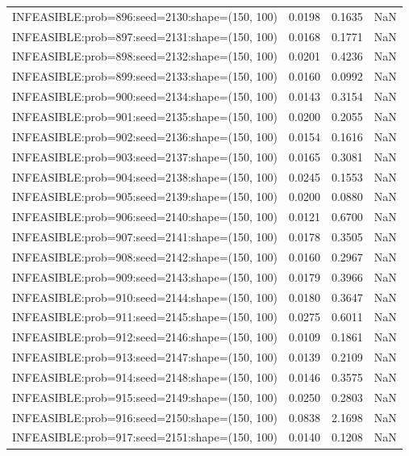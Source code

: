 \begin{longtable}{lccc}
INFEASIBLE:prob=896:seed=2130:shape=(150, 100) &   0.0198 &  0.1635 &    NaN \\
INFEASIBLE:prob=897:seed=2131:shape=(150, 100) &   0.0168 &  0.1771 &    NaN \\
INFEASIBLE:prob=898:seed=2132:shape=(150, 100) &   0.0201 &  0.4236 &    NaN \\
INFEASIBLE:prob=899:seed=2133:shape=(150, 100) &   0.0160 &  0.0992 &    NaN \\
INFEASIBLE:prob=900:seed=2134:shape=(150, 100) &   0.0143 &  0.3154 &    NaN \\
INFEASIBLE:prob=901:seed=2135:shape=(150, 100) &   0.0200 &  0.2055 &    NaN \\
INFEASIBLE:prob=902:seed=2136:shape=(150, 100) &   0.0154 &  0.1616 &    NaN \\
INFEASIBLE:prob=903:seed=2137:shape=(150, 100) &   0.0165 &  0.3081 &    NaN \\
INFEASIBLE:prob=904:seed=2138:shape=(150, 100) &   0.0245 &  0.1553 &    NaN \\
INFEASIBLE:prob=905:seed=2139:shape=(150, 100) &   0.0200 &  0.0880 &    NaN \\
INFEASIBLE:prob=906:seed=2140:shape=(150, 100) &   0.0121 &  0.6700 &    NaN \\
INFEASIBLE:prob=907:seed=2141:shape=(150, 100) &   0.0178 &  0.3505 &    NaN \\
INFEASIBLE:prob=908:seed=2142:shape=(150, 100) &   0.0160 &  0.2967 &    NaN \\
INFEASIBLE:prob=909:seed=2143:shape=(150, 100) &   0.0179 &  0.3966 &    NaN \\
INFEASIBLE:prob=910:seed=2144:shape=(150, 100) &   0.0180 &  0.3647 &    NaN \\
INFEASIBLE:prob=911:seed=2145:shape=(150, 100) &   0.0275 &  0.6011 &    NaN \\
INFEASIBLE:prob=912:seed=2146:shape=(150, 100) &   0.0109 &  0.1861 &    NaN \\
INFEASIBLE:prob=913:seed=2147:shape=(150, 100) &   0.0139 &  0.2109 &    NaN \\
INFEASIBLE:prob=914:seed=2148:shape=(150, 100) &   0.0146 &  0.3575 &    NaN \\
INFEASIBLE:prob=915:seed=2149:shape=(150, 100) &   0.0250 &  0.2803 &    NaN \\
INFEASIBLE:prob=916:seed=2150:shape=(150, 100) &   0.0838 &  2.1698 &    NaN \\
INFEASIBLE:prob=917:seed=2151:shape=(150, 100) &   0.0140 &  0.1208 &    NaN \\

\end{longtable}
